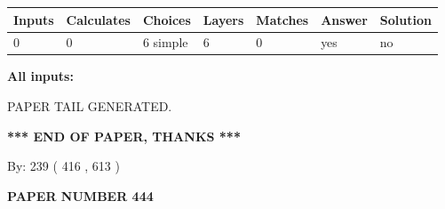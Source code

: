\documentclass[12pt]{article}
\begin{document}
 
\noindent{}
 
 
   
   
   
   
\noindent\begin{tabular}{|l|l|l|l|l|l|l|}
 \hline
Inputs & Calculates & Choices & Layers & Matches & Answer & Solution \\ \hline
 0  & 
 0  & 
 6
  simple  
  & 
 6  & 
 0  & 
  yes & 
  no 
  \\ \hline
 \end{tabular}
   
   
   
   
\noindent{}
   
   
   
   
\noindent\vspace{0.1in}\hspace{-0.08in} {\textbf{\Large{All inputs: }}}
   
   
   
   
   
   
 \vspace{0.2in}
 
   
   
\vspace{2.0in} PAPER TAIL GENERATED.
   
   
   
   
\vspace{1.0in} 
{\textbf{\large{ *** END OF PAPER, THANKS *** }}} 
   
   
\hspace{1.0in} By: 
 239 ( 416 ,  613 )
   
   
   
   
\newpage 
\setcounter{page}{ 
   444001 } 
   
   
   
   
 {\textbf{ \Large{ PAPER NUMBER  444  }}}
   
   
\vspace{0.2in}
   
   
   
   
   
   
   
   
 \vspace{0.2in}
 
\end{document}
